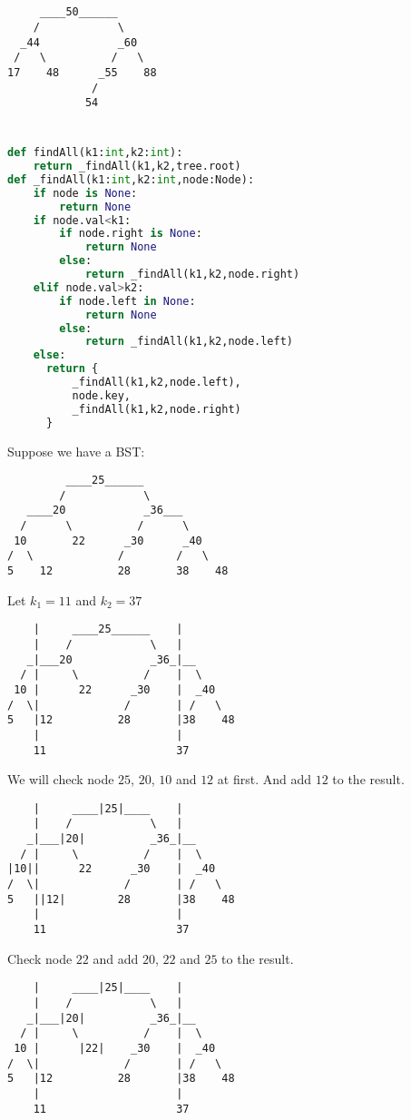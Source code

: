 \documentclass{article}
\begin{document}
\subsection{}
\begin{lstlisting}
     ____50______
    /            \
  _44            _60
 /   \          /   \
17    48      _55    88
             /
            54
\end{lstlisting}
\section{}
\begin{lstlisting}[language=Python]
def findAll(k1:int,k2:int):
    return _findAll(k1,k2,tree.root)
def _findAll(k1:int,k2:int,node:Node):
    if node is None:
        return None
    if node.val<k1:
        if node.right is None:
            return None
        else:
            return _findAll(k1,k2,node.right)
    elif node.val>k2:
        if node.left in None:
            return None
        else:
            return _findAll(k1,k2,node.left)
    else:
      return {
          _findAll(k1,k2,node.left),
          node.key,
          _findAll(k1,k2,node.right)  
      }
\end{lstlisting}
Suppose we have a BST:
\begin{lstlisting}
         ____25______
        /            \
   ____20            _36___
  /      \          /      \
 10       22      _30      _40
/  \             /        /   \
5    12          28       38    48
\end{lstlisting}
Let $k_1=11$ and $k_2=37$
\begin{lstlisting}
    |     ____25______    |
    |    /            \   |
   _|___20            _36_|__
  / |     \          /    |  \
 10 |      22      _30    |  _40
/  \|             /       | /   \
5   |12          28       |38    48
    |                     |
    11                    37
\end{lstlisting}
We will check node $25$, $20$, $10$ and $12$ at first. And add $12$ to the result.
\begin{lstlisting}
    |     ____|25|____    |
    |    /            \   |
   _|___|20|          _36_|__
  / |     \          /    |  \
|10||      22      _30    |  _40
/  \|             /       | /   \
5   ||12|        28       |38    48
    |                     |
    11                    37
\end{lstlisting}
Check node $22$ and add $20$, $22$ and $25$ to the result.
\begin{lstlisting}
    |     ____|25|____    |
    |    /            \   |
   _|___|20|          _36_|__
  / |     \          /    |  \
 10 |      |22|    _30    |  _40
/  \|             /       | /   \
5   |12          28       |38    48
    |                     |
    11                    37
\end{lstlisting}
\end{document}
